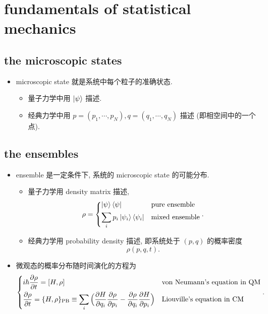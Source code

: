 \chapter{fundamentals of statistical mechanics}
\section{the microscopic states}
\begin{itemize}
	\item microscopic state 就是系统中每个粒子的准确状态.
	\begin{itemize}
		\item 量子力学中用 $\ket{\psi}$ 描述.
		
		\item 经典力学中用 $p = (p_1, \cdots, p_N), q = (q_1, \cdots, q_N)$ 描述 (即相空间中的一个点).
	\end{itemize}
\end{itemize}

\section{the ensembles}
\begin{itemize}
	\item ensemble 是一定条件下, 系统的 microscopic state 的可能分布.
	\begin{itemize}
		\item 量子力学用 density matrix 描述,
		\begin{equation}
			\rho = \begin{dcases}
				\ket{\psi} \bra{\psi} & \text{pure ensemble} \\
				\sum_i p_i \ket{\psi_i} \bra{\psi_i} & \text{mixed ensemble}
			\end{dcases}.
		\end{equation}
		
		\item 经典力学用 probability density 描述, 即系统处于 $(p, q)$ 的概率密度
		\begin{equation}
			\rho(p, q, t).
		\end{equation}
	\end{itemize}
	
	\item 微观态的概率分布随时间演化的方程为
	\begin{equation}
		\begin{dcases}
			i \hbar \frac{\partial \rho}{\partial t} = [H, \rho] & \text{von Neumann's equation in QM} \\
			\frac{\partial \rho}{\partial t} = \{H, \rho\}_{\text{PB}} \equiv \sum_i \Big( \frac{\partial H}{\partial q_i} \frac{\partial \rho}{\partial p_i} - \frac{\partial \rho}{\partial q_i} \frac{\partial H}{\partial p_i} \Big) & \text{Liouville's equation in CM}
		\end{dcases}.
	\end{equation}
\end{itemize}

